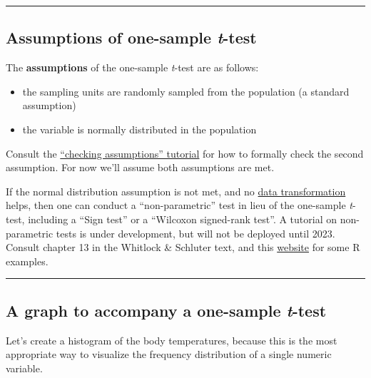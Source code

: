 \documentclass[
]{book}
\providecommand{\tightlist}{%
  \setlength{\itemsep}{0pt}\setlength{\parskip}{0pt}}
\begin{document}
\begin{center}\rule{0.5\linewidth}{0.5pt}\end{center}

\subsection{\texorpdfstring{Assumptions of one-sample \emph{t}-test}{Assumptions of one-sample t-test}}\label{onesamp_assumptions}

The \textbf{assumptions} of the one-sample \emph{t}-test are as follows:

\begin{itemize}
\tightlist
\item
  the sampling units are randomly sampled from the population (a standard assumption)
\item
  the variable is normally distributed in the population
\end{itemize}

Consult the \href{https://ubco-biology.github.io/BIOL202/checking-assumptions-and-data-transformations.html}{``checking assumptions'' tutorial} for how to formally check the second assumption. For now we'll assume both assumptions are met.

If the normal distribution assumption is not met, and no \href{https://ubco-biology.github.io/BIOL202/checking-assumptions-and-data-transformations.html}{data transformation} helps, then one can conduct a ``non-parametric'' test in lieu of the one-sample \emph{t}-test, including a ``Sign test'' or a ``Wilcoxon signed-rank test''. A tutorial on non-parametric tests is under development, but will not be deployed until 2023. Consult chapter 13 in the Whitlock \& Schluter text, and this \href{https://whitlockschluter3e.zoology.ubc.ca/RExamples/Rcode_Chapter_13.html\#new_methods_on_this_page}{website} for some R examples.

\begin{center}\rule{0.5\linewidth}{0.5pt}\end{center}

\subsection{\texorpdfstring{A graph to accompany a one-sample \emph{t}-test}{A graph to accompany a one-sample t-test}}\label{onesamp_graph}

Let's create a histogram of the body temperatures, because this is the most appropriate way to visualize the frequency distribution of a single numeric variable.
\end{document}
